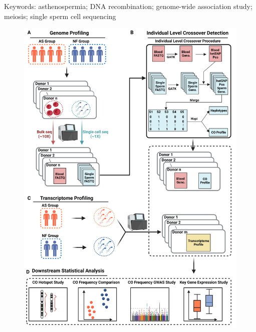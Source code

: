 \documentclass[
  letterpaper,
  DIV=11,
  numbers=noendperiod]{scrreprt}
\begin{document}
Keywords: asthenospermia; DNA recombination; genome-wide association
study; meiosis; single sperm cell sequencing

\begin{figure}

{\centering \includegraphics{Figures/s1.png}

}


\end{figure}
\end{document}
